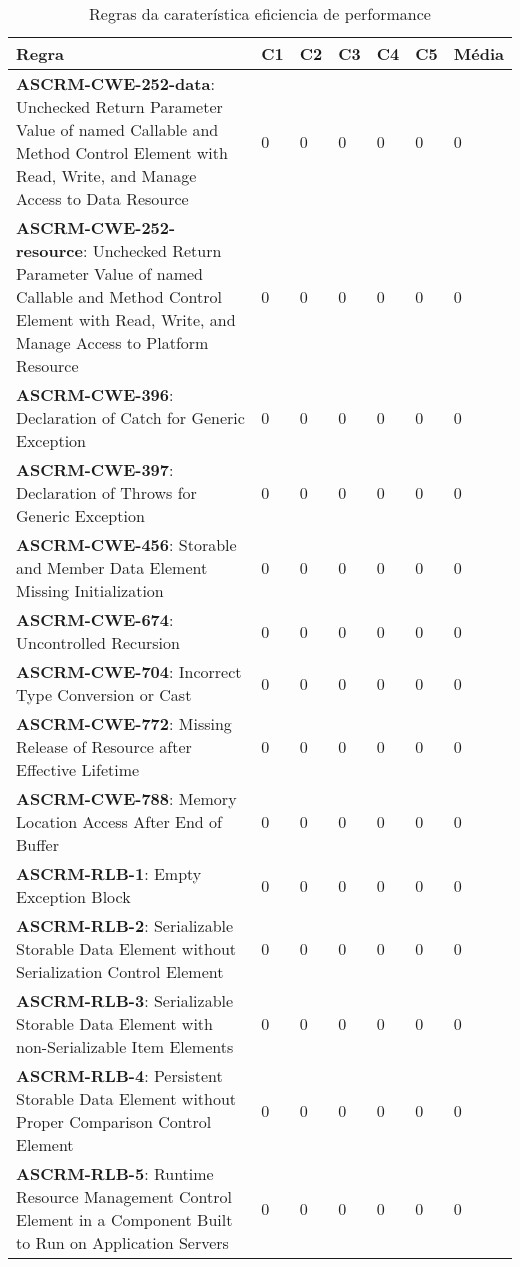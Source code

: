 \documentclass[openany,10pt,a4paper]{article}
\begin{document}
\begin{longtable}
\begin{table}[h]
	\centering
	\caption{Regras da caraterística eficiencia de performance}
	\begin{tabular}{|p{3in}|p{0.3in}|p{0.3in}|p{0.3in}|p{0.3in}|p{0.3in}|p{0.4in}|}
		\hline	
		\textbf{Regra} & \textbf{C1} & \textbf{C2} & \textbf{C3} & \textbf{C4} & \textbf{C5} & \textbf{Média} \\ \hline
		\textbf{ASCRM-CWE-252-data}: Unchecked Return Parameter Value of named Callable and Method Control Element with Read, Write, and Manage Access to Data Resource & 0 & 0 & 0 & 0 & 0 & 0 \\ \hline
\textbf{ASCRM-CWE-252-resource}: Unchecked Return Parameter Value of named Callable and Method Control Element with Read, Write, and Manage Access to Platform Resource & 0 & 0 & 0 & 0 & 0 & 0 \\ \hline
\textbf{ASCRM-CWE-396}: Declaration of Catch for Generic Exception & 0 & 0 & 0 & 0 & 0 & 0 \\ \hline
\textbf{ASCRM-CWE-397}: Declaration of Throws for Generic Exception & 0 & 0 & 0 & 0 & 0 & 0 \\ \hline
\textbf{ASCRM-CWE-456}: Storable and Member Data Element Missing Initialization & 0 & 0 & 0 & 0 & 0 & 0 \\ \hline
\textbf{ASCRM-CWE-674}: Uncontrolled Recursion & 0 & 0 & 0 & 0 & 0 & 0 \\ \hline
\textbf{ASCRM-CWE-704}: Incorrect Type Conversion or Cast & 0 & 0 & 0 & 0 & 0 & 0 \\ \hline
\textbf{ASCRM-CWE-772}: Missing Release of Resource after Effective Lifetime & 0 & 0 & 0 & 0 & 0 & 0 \\ \hline
\textbf{ASCRM-CWE-788}: Memory Location Access After End of Buffer & 0 & 0 & 0 & 0 & 0 & 0 \\ \hline
\textbf{ASCRM-RLB-1}: Empty Exception Block & 0 & 0 & 0 & 0 & 0 & 0 \\ \hline
\textbf{ASCRM-RLB-2}: Serializable Storable Data Element without Serialization Control Element & 0 & 0 & 0 & 0 & 0 & 0 \\ \hline
\textbf{ASCRM-RLB-3}: Serializable Storable Data Element with non-Serializable Item Elements & 0 & 0 & 0 & 0 & 0 & 0 \\ \hline
\textbf{ASCRM-RLB-4}: Persistent Storable Data Element without Proper Comparison Control Element & 0 & 0 & 0 & 0 & 0 & 0 \\ \hline
\textbf{ASCRM-RLB-5}: Runtime Resource Management Control Element in a Component Built to Run on Application Servers & 0 & 0 & 0 & 0 & 0 & 0 \\ \hline

\end{tabular}
\end{table}
\end{longtable}
\end{document}
